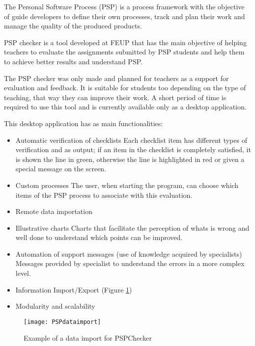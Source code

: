 The Personal Software Process (PSP) \citep{humphrey2005psp} is a process framework with the objective of guide developers to define their own processes, track and plan their work and manage the quality of the produced products.

PSP checker \citep{Pinto2010} is a tool developed at FEUP that has the main objective of helping teachers to evaluate the assignments submitted by PSP students  and help them to achieve better results and understand PSP.

The PSP checker was only made and planned for teachers as a support for evaluation and feedback. It is suitable for students too depending on the type of teaching, that way they can improve their work. A short period of time is required to use this tool and is currently available only as a desktop application.


This desktop application has as main functionalities:
\begin{itemize}
	\item Automatic verification of checklists
	\subitem Each checklist item has different types of verification and as output; if an item in the checklist is completely satisfied, it is shown the line in green, otherwise the line is highlighted in red or given a special message on the screen.
	\item Custom processes
	\subitem The user, when starting the program, can choose which items of the PSP process to associate with this evaluation.
	\item Remote data importation
	\item Illustrative charts
	\subitem Charts that facilitate the perception of whats is wrong and well done to understand which points can be improved.
	\item Automation of support messages (use of knowledge acquired by specialists)
	\subitem Messages provided by specialist to understand the errors in a more complex level.
	\item Information Import/Export (Figure \ref{fig:PSPdataimport})
	\item Modularity and scalability
\end{itemize}

\begin{figure}[h]
	\begin{center}
		\leavevmode
		\texttt{[image: PSPdataimport]}
		\caption{Example of a data import for PSPChecker}
		\label{fig:PSPdataimport}
	\end{center}
\end{figure}

